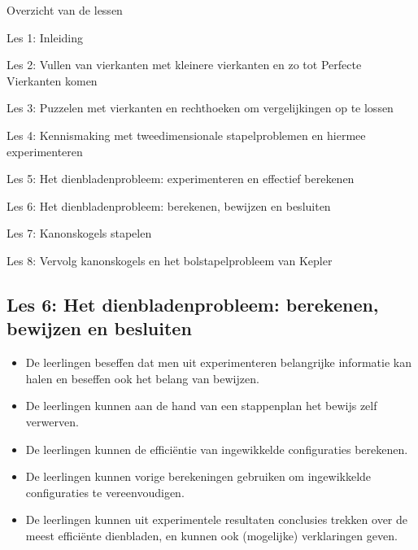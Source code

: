 \documentclass[dutch]{beamer}
\begin{document}
\begin{frame}
{Overzicht van de lessen}
\begin{list}{\quad}{}
\item Les 1: Inleiding
\item Les 2: Vullen van vierkanten met kleinere vierkanten en zo tot Perfecte Vierkanten komen
\item Les 3: Puzzelen met vierkanten en rechthoeken om vergelijkingen op te lossen
\item Les 4: Kennismaking met tweedimensionale stapelproblemen en hiermee experimenteren
\item Les 5: Het dienbladenprobleem: experimenteren en effectief berekenen
\item {\color{blue}Les 6: Het dienbladenprobleem: berekenen, bewijzen en besluiten}
\item Les 7: Kanonskogels stapelen
\item Les 8: Vervolg kanonskogels en het bolstapelprobleem van Kepler
\end{list}
\end{frame}

\subsection{Les 6: Het dienbladenprobleem: berekenen, bewijzen en besluiten}

\begin{frame}
\begin{itemize}
\item De leerlingen beseffen dat men uit experimenteren belangrijke informatie kan halen en beseffen ook het belang van bewijzen.
\item De leerlingen kunnen aan de hand van een stappenplan het bewijs zelf verwerven.
\item De leerlingen kunnen de effici\"{e}ntie van ingewikkelde configuraties berekenen.
\item De leerlingen kunnen vorige berekeningen gebruiken om ingewikkelde configuraties te vereenvoudigen.
\item De leerlingen kunnen uit experimentele resultaten conclusies trekken over de meest effici\"{e}nte dienbladen, en kunnen ook (mogelijke) verklaringen geven.
\end{itemize}
\end{frame}
\end{document}
